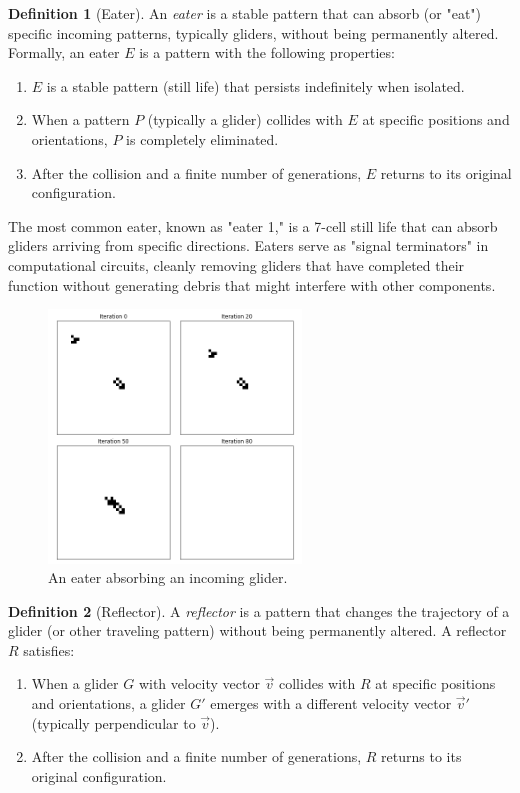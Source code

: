 \documentclass{article}
\theoremstyle{definition}
\newtheorem{definition}{Definition}[section]
\theoremstyle{plain}
\theoremstyle{plain}
\begin{document}
\begin{definition}[Eater]
An \textit{eater} is a stable pattern that can absorb (or "eat") specific incoming patterns, typically gliders, without being permanently altered. Formally, an eater $E$ is a pattern with the following properties:
\begin{enumerate}
  \item $E$ is a stable pattern (still life) that persists indefinitely when isolated.
  \item When a pattern $P$ (typically a glider) collides with $E$ at specific positions and orientations, $P$ is completely eliminated.
  \item After the collision and a finite number of generations, $E$ returns to its original configuration.
\end{enumerate}
\end{definition}

The most common eater, known as "eater 1," is a 7-cell still life that can absorb gliders arriving from specific directions. Eaters serve as "signal terminators" in computational circuits, cleanly removing gliders that have completed their function without generating debris that might interfere with other components.

\begin{figure}[H]
  \centering
  \includegraphics[width=0.6\textwidth]{figures/eater_interaction_iterations.png} %
  \caption{An eater absorbing an incoming glider.}
  \label{fig:eater}
\end{figure}

\begin{definition}[Reflector]
A \textit{reflector} is a pattern that changes the trajectory of a glider (or other traveling pattern) without being permanently altered. A reflector $R$ satisfies:
\begin{enumerate}
  \item When a glider $G$ with velocity vector $\vec{v}$ collides with $R$ at specific positions and orientations, a glider $G'$ emerges with a different velocity vector $\vec{v}'$ (typically perpendicular to $\vec{v}$).
  \item After the collision and a finite number of generations, $R$ returns to its original configuration.
\end{enumerate}
\end{definition}
\end{document}
